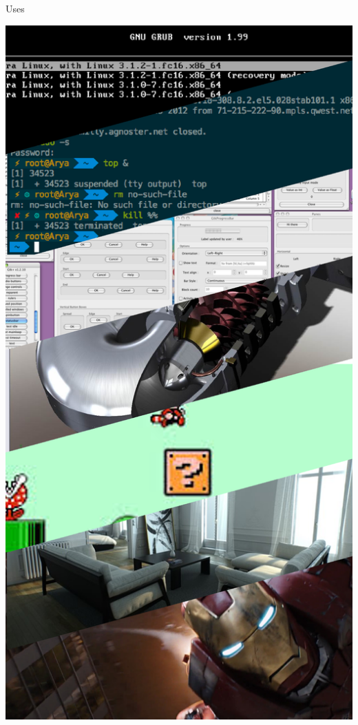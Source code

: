 \documentclass{lug}
\newcommand{\pmidg}[1]{\parbox{\widthof{#1}}{#1}}
\begin{document}
\begin{frame}{Uses}
\begin{minipage}{.35\textwidth}
        \pmidg{\includegraphics[width=\textwidth]{graphics/uses}}
    \end{minipage}
\end{frame}
\end{document}
